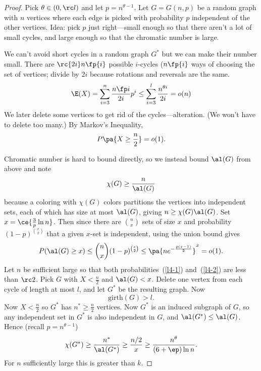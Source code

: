 \begin{proof}
Pick $\theta\in (0,\rc l)$ and let $p=n^{\theta-1}$. Let $G=G(n,p)$ be a random graph with $n$ vertices where each edge is picked with probability $p$ independent of the other vertices. Idea: pick $p$ just right---small enough so that there aren't a lot of small cycles, and large enough so that the chromatic number is large.

We can't avoid short cycles in a random graph $G^*$ but we can make their number small. There are $\rc{2i}n\fp{i}$ possible $i$-cycles ($n\fp{i}$ ways of choosing the set of vertices; divide by $2i$ because rotations and reversals are the same.
\[
\E(X)=\sum_{i=3}^n \frac{n\fp i}{2i}p^i\leq \sum_{i=3}^l\frac{n^{\theta i}}{2i}=o(n)
\] 
We later delete some vertices to get rid of the cycles---alteration. (We won't have to delete too many.) By Markov's Inequality,
\begin{equation}\label{l4-1}
P\pa{X\geq \frac n2}=o(1).
\end{equation}

Chromatic number is hard to bound directly, so we instead bound $\al(G)$ from above and note
\[
\chi(G)\geq \frac{n}{\al(G)}
\]
because a coloring with $\chi(G)$ colors partitions the vertices into independent sets, each of which has size at most $\al(G)$, giving $n\geq \chi(G)\al(G)$.
Set $x=\ce{\frac 3p\ln n}$. Then since there are $\binom nx$ sets of size $x$ and probability $(1-p)^{\binom x2}$ that a given $x$-set is independent, using the union bound gives
\begin{equation}\label{l4-2}
P(\al(G)\geq x)\leq \binom nx(1-p)^{\binom x2}\leq \pa{ne^{-\frac{p(x-1)}{2}}}^x=o(1).
\end{equation}
Let $n$ be sufficient large so that both probabilities~(\ref{l4-1}) and~(\ref{l4-2}) are less than $\rc 2$. Pick $G$ with $X<\frac n2$ and $\al(G)<x$. Delete one vertex from each cycle of length at most $l$, and let $G^*$ be the resulting graph. Now 
\[\text{girth}(G)>l.\]
Now $X<\frac n2$ so $G^*$ has $n^*\geq \frac n2$ vertices. Now $G^*$ is an induced subgraph of $G$, so any independent set in $G^*$ is also independent in $G$, and $\al(G^*)\leq \al(G)$. Hence (recall $p=n^{\theta-1}$)
\[
\chi(G^*)\geq \frac{n^*}{\al(G^*)}\geq \frac{n/2}{x}\geq \frac{n^{\theta}}{(6+\ep)\ln n}.
\] 
For $n$ sufficiently large this is greater than $k$.
\end{proof}
